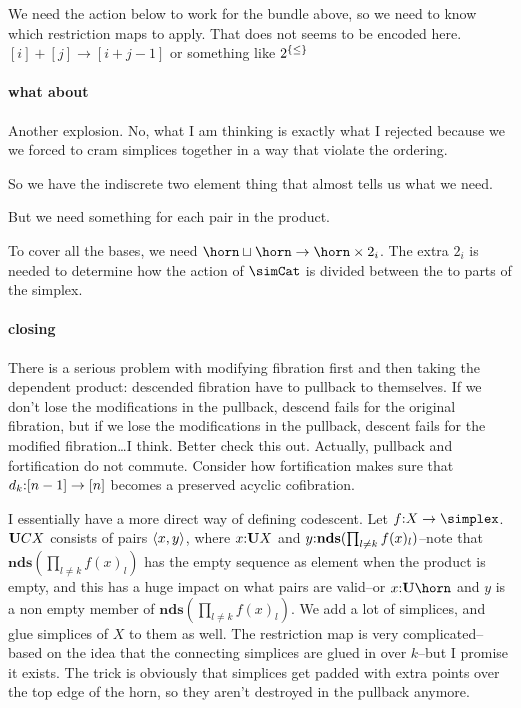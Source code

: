 \documentclass[csh.tex]{subfiles}
\begin{document}
We need the action below to work for the bundle above, so we need to know which restriction maps to apply. That does not seems to be encoded here.
$[i]+[j]\to [i+j-1]$ or something like $2^{\left\{\leq\right\}}$

\paragraph{what about}
Another explosion. No, what I am thinking is exactly what I rejected because we we forced to cram simplices together in a way that violate the ordering.

So we have the indiscrete two element thing that almost tells us what we need.

But we need something for each pair in the product.

To cover all the bases, we need $\horn \sqcup \horn \to \horn \times 2_i$. The extra $2_i$ is needed to determine how the action of $\simCat$ is divided between the to parts of the simplex. 


\paragraph{closing}
There is a serious problem with modifying fibration first and then taking the dependent product: descended fibration have to pullback to themselves. If we don't lose the modifications in the pullback, descend fails for the original fibration, but if we lose the modifications in the pullback, descent fails for the modified fibration\dots I think. Better check this out. 
Actually, pullback and fortification do not commute. Consider how fortification makes sure that $d_k\mathord :[n-1]\to[n]$ becomes a preserved acyclic cofibration.

I essentially have a more direct way of defining codescent. Let $f\of X\to \simplex$.
$\mathbf{U} CX$ consists of pairs $\left\langle x,y \right\rangle$, where $x\mathord : \mathbf{U} X$ and $y\mathord : \mathbf{nds}(\prod_{l\neq k} f(x)_l)$--note that $\mathbf{nds}(\prod_{l\neq k} f(x)_l)$ has the empty sequence as element when the product is empty, and this has a huge impact on what pairs are valid--or $x\of
\base\horn$ and $y$ is a non empty member of $\mathbf{nds}(\prod_{l\neq k} f(x)_l)$. We add a lot of simplices, and glue simplices of $X$ to them as well.
The restriction map is very complicated--based on the idea that the connecting simplices are glued in over $k$--but I promise it exists.
The trick is obviously that simplices get padded with extra points over the top edge of the horn, so they aren't destroyed in the pullback anymore.
\end{document}
